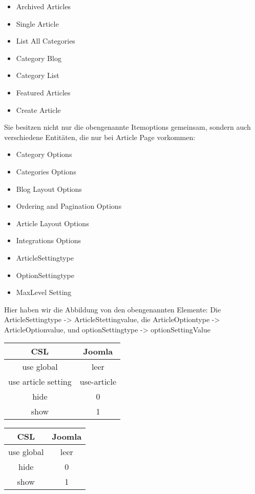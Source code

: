 \begin{itemize}
\item Archived Articles
\item Single Article
\item List All Categories
\item Category Blog
\item Category List
\item Featured Articles
\item Create Article
\end{itemize} 

Sie besitzen nicht nur die obengenannte Itemoptions gemeinsam, sondern auch verschiedene Entitäten, die nur bei Article Page vorkommen:

\begin{itemize}
\item Category Options
\item Categories Options
\item Blog Layout Options
\item Ordering and Pagination Options
\item Article Layout Options
\item Integrations Options
\item ArticleSettingtype
\item OptionSettingtype
\item MaxLevel Setting
\end{itemize}

Hier haben wir die Abbildung von den obengenannten Elemente: Die ArticleSettingtype -> ArticleStettingvalue, die ArticleOptiontype -> ArticleOptionvalue, und optionSettingtype -> optionSettingValue


\begin{minipage}{0.5\textwidth}
\begin{tabular}{|c|c|}
\hline
\textbf{CSL} & \textbf{Joomla} \\ 
\hline
 use global & leer \\ 
 \hline
use article setting & use-article\\ 
\hline
hide & 0 \\ 
\hline
show & 1 \\ 
\hline
\end{tabular}
\end{minipage}
\begin{minipage}{0.5\textwidth}
\begin{tabular}{|c|c|}
\hline
\textbf{CSL} & \textbf{Joomla} \\ 
\hline
use global & leer \\ 
\hline
hide & 0 \\ 
\hline
show & 1 \\  
\hline
\end{tabular}
\end{minipage}

